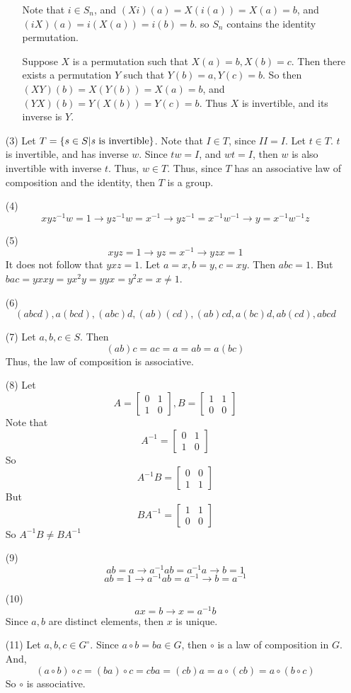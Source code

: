 \documentclass[12pt]{article}
\begin{document}
\begin{itemize}
\begin{itemize}
Note that $i \in S_n$, and $(Xi)(a) = X(i(a)) = X(a) = b$, and $(iX)(a) = i(X(a)) = i(b) = b$. so $S_n$ contains the identity permutation.

Suppose $X$ is a permutation such that $X(a) = b, X(b) = c$. Then there exists a permutation $Y$ such that $Y(b) = a, Y(c) = b$. So then $(XY)(b) = X(Y(b)) = X(a) = b$, and $(YX)(b) = Y(X(b)) = Y(c) = b$. Thus $X$ is invertible, and its inverse is $Y$.
\end{itemize}
\item[(3)]
Let $T = \left\lbrace s \in S | \text{\emph{s} is invertible} \right\rbrace$. Note that $I \in T$, since $II = I$. Let $t \in T$. $t$ is invertible, and has inverse $w$. Since $tw = I$, and $wt = I$, then $w$ is also invertible with inverse $t$. Thus, $w \in T$. Thus, since $T$ has an associative law of composition and the identity, then $T$ is a group.
\item[(4)]
$$xyz^{-1}w = 1 \rightarrow yz^{-1}w = x^{-1} \rightarrow yz^{-1} = x^{-1}w^{-1} \rightarrow y = x^{-1}w^{-1}z$$
\item[(5)]
$$xyz = 1 \rightarrow yz = x^{-1} \rightarrow yzx = 1$$
It does not follow that $yxz = 1$. Let $a = x, b = y, c = xy$. Then $abc = 1$. But $bac = yxxy = yx^2y = yyx = y^2x = x \neq 1$.
\item[(6)]
$$(abcd), a(bcd), (abc)d, (ab)(cd), (ab)cd, a(bc)d, ab(cd), abcd$$
\item[(7)]
Let $a, b, c \in S$. Then
$$(ab)c = ac = a = ab = a(bc)$$
Thus, the law of composition is associative.
\item[(8)]
Let $$A = \begin{bmatrix}
0 & 1 \\
1 & 0
\end{bmatrix}, B = \begin{bmatrix}
1 & 1 \\
0 & 0
\end{bmatrix}$$
Note that
$$A^{-1} = \begin{bmatrix}
0 & 1 \\
1 & 0
\end{bmatrix}$$
So
$$A^{-1}B = \begin{bmatrix}
0 & 0 \\
1 & 1
\end{bmatrix}$$
But
$$BA^{-1} = \begin{bmatrix}
1 & 1 \\
0 & 0
\end{bmatrix}$$
So $A^{-1}B \neq BA^{-1}$
\item[(9)]
$$ab = a \rightarrow a^{-1}ab = a^{-1}a \rightarrow b = 1$$
$$ab = 1 \rightarrow a^{-1}ab = a^{-1} \rightarrow b = a^{-1}$$
\item[(10)]
$$ax = b \rightarrow x = a^{-1}b$$
Since $a, b$ are distinct elements, then $x$ is unique.
\item[(11)]
Let $a, b, c \in G^\circ$. Since $a \circ b = ba \in G$, then $\circ$ is a law of composition in $G$. And,
$$(a \circ b) \circ c = (ba) \circ c = cba = (cb)a = a \circ (cb) = a \circ (b \circ c)$$
So $\circ$ is associative.


\end{itemize}
\end{document}
